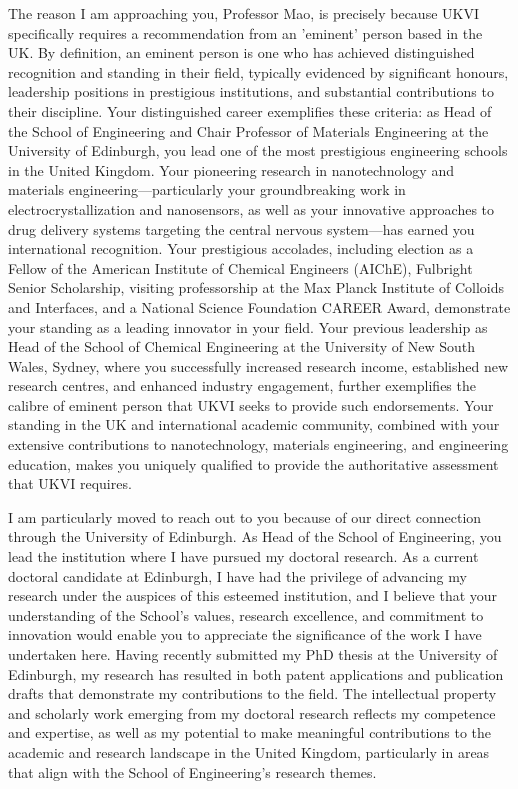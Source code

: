 \documentclass[12pt,a4paper]{letter}
\begin{document}
\begin{letter}
The reason I am approaching you, Professor Mao, is precisely because UKVI specifically requires a recommendation from an 'eminent' person based in the UK. By definition, an eminent person is one who has achieved distinguished recognition and standing in their field, typically evidenced by significant honours, leadership positions in prestigious institutions, and substantial contributions to their discipline. Your distinguished career exemplifies these criteria: as Head of the School of Engineering and Chair Professor of Materials Engineering at the University of Edinburgh, you lead one of the most prestigious engineering schools in the United Kingdom. Your pioneering research in nanotechnology and materials engineering—particularly your groundbreaking work in electrocrystallization and nanosensors, as well as your innovative approaches to drug delivery systems targeting the central nervous system—has earned you international recognition. Your prestigious accolades, including election as a Fellow of the American Institute of Chemical Engineers (AIChE), Fulbright Senior Scholarship, visiting professorship at the Max Planck Institute of Colloids and Interfaces, and a National Science Foundation CAREER Award, demonstrate your standing as a leading innovator in your field. Your previous leadership as Head of the School of Chemical Engineering at the University of New South Wales, Sydney, where you successfully increased research income, established new research centres, and enhanced industry engagement, further exemplifies the calibre of eminent person that UKVI seeks to provide such endorsements. Your standing in the UK and international academic community, combined with your extensive contributions to nanotechnology, materials engineering, and engineering education, makes you uniquely qualified to provide the authoritative assessment that UKVI requires.

I am particularly moved to reach out to you because of our direct connection through the University of Edinburgh. As Head of the School of Engineering, you lead the institution where I have pursued my doctoral research. As a current doctoral candidate at Edinburgh, I have had the privilege of advancing my research under the auspices of this esteemed institution, and I believe that your understanding of the School's values, research excellence, and commitment to innovation would enable you to appreciate the significance of the work I have undertaken here. Having recently submitted my PhD thesis at the University of Edinburgh, my research has resulted in both patent applications and publication drafts that demonstrate my contributions to the field. The intellectual property and scholarly work emerging from my doctoral research reflects my competence and expertise, as well as my potential to make meaningful contributions to the academic and research landscape in the United Kingdom, particularly in areas that align with the School of Engineering's research themes.


\end{letter}
\end{document}
